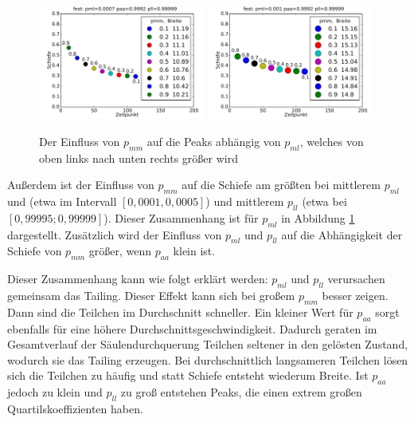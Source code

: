 \begin{figure}[h]
\includegraphics[width=0.49\textwidth]{bilder/pmm/3fest_p_00007_09992_099999}
\includegraphics[width=0.49\textwidth]{bilder/pmm/3fest_p_0001_09992_099999}
\caption[Der Einfluss von $p_{mm}$ auf die Peaks abhängig von $p_{ml}$]{Der Einfluss von $p_{mm}$ auf die Peaks abhängig von $p_{ml}$, welches von oben links nach unten rechts größer wird}
\label{einfluss_pmm_2}
\end{figure}

Außerdem ist der Einfluss von $p_{mm}$ auf die Schiefe am größten bei mittlerem $p_{ml}$ und (etwa im Intervall $[0,0001, 0,0005]$) und mittlerem $p_{ll}$ (etwa bei $[0,99995; 0,99999]$). Dieser Zusammenhang ist für $p_{ml}$ in Abbildung \ref{einfluss_pmm_2} dargestellt.
Zusätzlich wird der Einfluss von $p_{ml}$ und $p_{ll}$ auf die Abhängigkeit der Schiefe von $p_{mm}$ größer, wenn $p_{aa}$ klein ist.


Dieser Zusammenhang kann wie folgt erklärt werden: $p_{ml}$ und $p_{ll}$ verursachen gemeinsam das Tailing. Dieser Effekt kann sich bei großem $p_{mm}$ besser zeigen. Dann sind die Teilchen im Durchschnitt schneller. Ein kleiner Wert für $p_{aa}$ sorgt ebenfalls für eine höhere Durchschnittsgeschwindigkeit. Dadurch geraten im Gesamtverlauf der Säulendurchquerung Teilchen seltener in den gelösten Zustand, wodurch sie das Tailing erzeugen. Bei durchschnittlich langsameren Teilchen lösen sich die Teilchen zu häufig und statt Schiefe entsteht wiederum Breite.
Ist $p_{aa}$ jedoch zu klein und $p_{ll}$ zu groß entstehen Peaks, die einen extrem großen Quartilskoeffizienten haben. %

